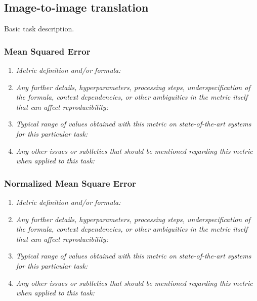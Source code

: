 \documentclass[a4paper,11pt]{article}
\begin{document}
    \subsection{Image-to-image translation}
        Basic task description.
        \subsubsection{Mean Squared Error}
            \begin{enumerate}[label=\alph*.]
                \item \textit{Metric definition and/or formula:}
                \bigskip
                \item \textit{Any further details, hyperparameters, processing steps, underspecification of the formula, context dependencies, or other ambiguities in the metric itself that can affect reproducibility:}
                \bigskip
                \item \textit{Typical range of values obtained with this metric on state-of-the-art systems for this particular task:}
                \bigskip
                \item \textit{Any other issues or subtleties that should be mentioned regarding this metric when applied to this task:}
                \bigskip
            \end{enumerate}
        \subsubsection{Normalized Mean Square Error}
            \begin{enumerate}[label=\alph*.]
                \item \textit{Metric definition and/or formula:}
                \bigskip
                \item \textit{Any further details, hyperparameters, processing steps, underspecification of the formula, context dependencies, or other ambiguities in the metric itself that can affect reproducibility:}
                \bigskip
                \item \textit{Typical range of values obtained with this metric on state-of-the-art systems for this particular task:}
                \bigskip
                \item \textit{Any other issues or subtleties that should be mentioned regarding this metric when applied to this task:}
                \bigskip
            \end{enumerate}
\end{document}
